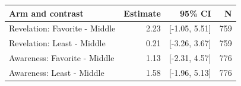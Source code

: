 \begin{tabular}{@{}p{6.0cm}rrr@{}}
\toprule
Arm and contrast & Estimate & 95\% CI & N \\
\midrule
Revelation: Favorite - Middle & 2.23 & [-1.05, 5.51] & 759 \\
Revelation: Least - Middle & 0.21 & [-3.26, 3.67] & 759 \\
Awareness: Favorite - Middle & 1.13 & [-2.31, 4.57] & 776 \\
Awareness: Least - Middle & 1.58 & [-1.96, 5.13] & 776 \\
\bottomrule
\end{tabular}
